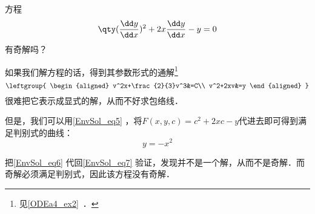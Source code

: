 \begin{example}{}
方程
\begin{equation}\label{EnvSol_eq7}
\qty(\frac{\dd y}{\dd x})^2+2x\frac{\dd y}{\dd x}-y=0
\end{equation}
有奇解吗？

如果我们解方程的话，得到其参数形式的通解\footnote{见\autoref{ODEa4_ex2}~．}
\begin{equation}
\leftgroup{
    \begin{aligned}
    v^2x+\frac{2}{3}v^3&=C\\
    v^2+2xv&=y
    \end{aligned}
}
\end{equation}
很难把它表示成显式的解，从而不好求包络线．

但是，我们可以用\autoref{EnvSol_eq5} ，将$F(x, y, c)=c^2+2xc-y$代进去即可得到满足判别式的曲线：
\begin{equation}\label{EnvSol_eq6}
y=-x^2
\end{equation}

把\autoref{EnvSol_eq6} 代回\autoref{EnvSol_eq7} 验证，发现并不是一个解，从而不是奇解．而奇解必须满足判别式，因此该方程没有奇解．

\end{example}























